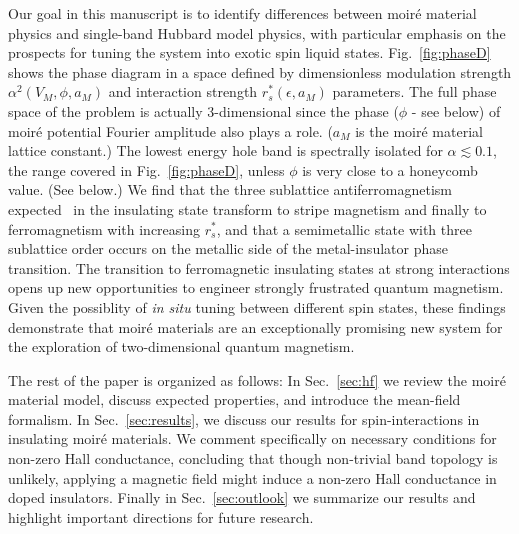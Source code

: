 \documentclass[%
 reprint,
 superscriptaddress,
 amsmath,amssymb,
 aps,
 prx,
 floatfix,
]{revtex4-2}
\newcommand{\<}{\langle}
\renewcommand{\>}{\rangle}
\renewcommand{\(}{\left(}
\renewcommand{\)}{\right)}
\renewcommand{\[}{\left[}
\renewcommand{\]}{\right]}
\begin{document}
Our goal in this manuscript is to identify differences between 
moir\'e material physics and single-band Hubbard model physics, with particular emphasis on the 
prospects for tuning the system into exotic spin liquid states. Fig.~\ref{fig:phaseD} shows the phase 
diagram in a space defined by dimensionless modulation strength $\alpha^2(V_M,\phi,a_M)$ and interaction 
strength $r_s^*(\epsilon, a_M)$ parameters. The full phase space of the problem is
actually 3-dimensional since the phase ($\phi$ - see below) of moir\'e potential Fourier amplitude also plays a role.
($a_M$ is the moir\'e material lattice constant.)
The lowest energy hole band is spectrally isolated for $\alpha\lesssim0.1$, the range covered in Fig.~\ref{fig:phaseD},
unless $\phi$ is very close to a honeycomb value.  (See below.)
We find that the three sublattice antiferromagnetism expected~ \cite{JolicoeurPhysRevB1990} in the insulating state 
transform to stripe magnetism and finally to ferromagnetism with increasing $r_s^*$, and that a semimetallic state 
with three sublattice order occurs on the metallic side of the metal-insulator phase transition.  
The transition to ferromagnetic insulating states at strong interactions 
opens up new opportunities to engineer strongly frustrated quantum magnetism.
Given the possiblity of {\em in situ} tuning between different spin states,
these findings demonstrate that moir\'e materials are an exceptionally promising new system for the 
exploration of two-dimensional quantum magnetism.

The rest of the paper is organized as follows: 
In Sec.~\ref{sec:hf} we review the moir\'e material model, discuss expected properties,
and introduce the mean-field formalism. In Sec.~\ref{sec:results}, 
we discuss our results for spin-interactions in insulating moir\'e materials. 
We comment specifically on necessary conditions for non-zero Hall conductance, 
concluding that though non-trivial band topology is unlikely, applying a magnetic 
field might induce a non-zero Hall conductance in doped insulators.  Finally in 
Sec.~\ref{sec:outlook} we summarize our results and highlight important directions for 
future research.  
\end{document}
